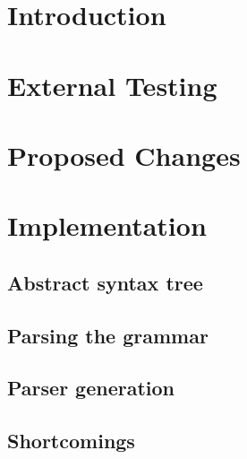 \section{Introduction}


\section{External Testing}


\section{Proposed Changes}


\section{Implementation}


\subsection{Abstract syntax tree}


\subsection{Parsing the grammar}


\subsection{Parser generation}


\subsection{Shortcomings}

% 




